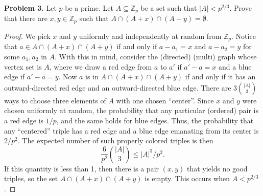 \documentclass[11pt,letterpaper]{report}
\newcommand{\integers}{\mathbb{Z}}
\begin{document}
\noindent\textbf{Problem 3. }
Let $p$ be a prime.
Let $A\subseteq \integers_p$ be a set such that $|A| < p^{2/3}$.
Prove that there are $x,y\in \integers_p$ such that $A\cap (A+x)\cap (A+y) = \emptyset$.
\begin{proof}
  We pick $x$ and $y$ uniformly and independently at random from $\integers_p$.
  Notice that $a\in A\cap (A+x)\cap (A+y)$ if and only if $a -a_1 = x$ and $a-a_2 = y$ for some $a_1, a_2$ in $A$.
  With this in mind, consider the (directed) (multi) graph whose vertex set is $A$, where we draw a red edge from $a$ to $a'$ if $a'-a = x$ and a blue edge if $a'-a = y$.
  Now $a$ is in $A\cap (A+x)\cap (A+y)$ if and only if it has an outward-directed red edge and an outward-directed blue edge.
  There are $3\binom{|A|}{3}$ ways to choose three elements of $A$ with one chosen ``center''.
  Since $x$ and $y$ were chosen uniformly at random, the probability that any particular (ordered) pair is a red edge is $1/p$, and the same holds for blue edges.
  Thus, the probability that any ``centered'' triple has a red edge and a blue edge emanating from its center is $2/p^2$.
  The expected number of such properly colored triples is then
  \[
  \frac{6}{p^2}\binom{|A|}{3} \leq |A|^3/p^2.
  \]
  If this quantity is less than 1, then there is a pair $(x,y)$ that yields no good triples, so the set $A\cap (A+x)\cap (A+y)$ is empty.
  This occurs when $A < p^{2/3}$.
\end{proof}
\end{document}
